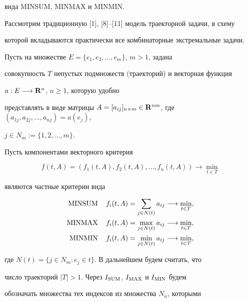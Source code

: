 вида MINSUM, MINMAX и MINMIN.





Рассмотрим традиционную [1], [8]--[11] модель траекторной задачи, в схему


которой вкладываются практически все комбинаторные экстремальные задачи.


Пусть на множестве $E =\{e_{1},e_{2},\dotsc,e_{m}\}$, $m>1$, задана


совокупность $T$ непустых подмножеств (траекторий) и векторная функция


$a: E \longrightarrow\bold R^n$, $n\geq1$, которую удобно


представлять в виде матрицы $A = [ a_{ij}]_{n\times m} \in


{\bold R}^{nm}$, где $(a_{1j}, a_{2j},\dotsc,a_{nj})=a(e_{j})$,


$j \in N_{m} := \{1,2,\dotsc,m\}$.





Пусть компонентами векторного критерия


$$


f(t,A) = (f_{1}(t,A),f_{2}(t,A),\dotsc,f_{n}(t,A)) \longrightarrow


\min_{t \in T}


$$


являются частные критерии вида


\begin{align*}


\MINSUM \quad f_{i}(t,A) &= \sum_{j \in N(t)}a_{ij}


\longrightarrow \min_{t \in T}, \\


%


\MINMAX \quad f_{i}(t,A) &= \max_{j \in N(t)}a_{ij}


\longrightarrow \min_{t \in T}, \\


%


\MINMIN \quad f_{i}(t,A) &= \min_{j \in N(t)}a_{ij}


\longrightarrow \min_{t \in T},


\end{align*}


где $N(t)=\{j\in N_{m}: e_{j}\in t\}$. В дальнейшем будем считать, что


число траекторий $|T|>1$. Через $I_{\operatorname{SUM}}$, $I_{\operatorname{MAX}}$ и $I_{\operatorname{MIN}}$ будем


обозначать множества тех индексов из множества $N_n$, которыми


